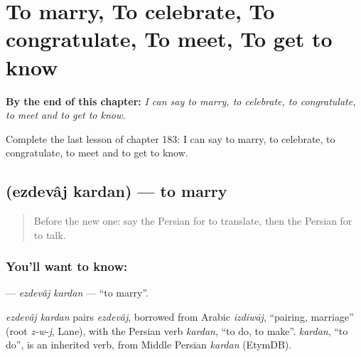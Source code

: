 
\chapter{To marry, To celebrate, To congratulate, To meet, To get to know}
\label{ch:fa-to-marry-to-celebrate-to-congratulate-to-meet-to-get-to-know}

\begin{chapteropening}
\textbf{By the end of this chapter:} \emph{I can say to marry, to celebrate, to congratulate, to meet and to get to know.}

Complete the last lesson of chapter 183: I can say to marry, to celebrate, to congratulate, to meet and to get to know.
\end{chapteropening}

\section[\texorpdfstring{\fa{ازدواج} \fa{کردن} (ezdevâj kardan)}{ازدواج کردن (ezdevâj kardan)}]{  (ezdevâj kardan) — to marry}

\label{lesson:FA-C183-ezdevaj-kardan}



\begin{quote}
Before the new one: say the Persian for to translate, then the Persian for to talk.
\end{quote}

\subsection*{You'll want to know:  }
\textbf{ } — \emph{ezdevâj kardan} — \textquotedblleft{}to marry\textquotedblright{}.

\begin{cousinweb}
\emph{ezdevâj kardan} pairs \emph{ezdevâj}, borrowed from Arabic \emph{izdiwāj}, \textquotedblleft{}pairing, marriage\textquotedblright{} (root \emph{z-w-j}, Lane), with the Persian verb \emph{kardan}, \textquotedblleft{}to do, to make\textquotedblright{}. \emph{kardan}, \textquotedblleft{}to do\textquotedblright{}, is an inherited verb, from Middle Persian \emph{kardan} (EtymDB).
\end{cousinweb}

